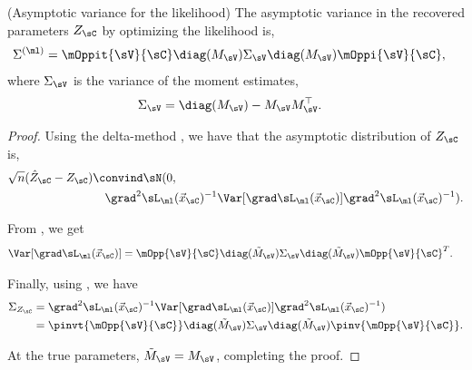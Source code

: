 \begin{lemma}(Asymptotic variance for the likelihood)
  \label{lem:pw-variance}
  The asymptotic variance in the recovered parameters $Z_{\sC}$ by optimizing the likelihood is,
  \begin{align*}
    \Sigma^{(\ml)} &= \mOppit{\sV}{\sC} \diag(M_\sV) \Sigma_\sV \diag(M_\sV) \mOppi{\sV}{\sC},
  \end{align*}
  where $\Sigma_\sV$ is the variance of the moment estimates, 
  \begin{align*}
    \Sigma_\sV &= \diag(M_\sV) - M_\sV M_\sV^\top.
  \end{align*}
\end{lemma}
\begin{proof}
  Using the delta-method \cite{vaart98asymptotic}, we have that the
  asymptotic distribution of $Z_\sC$ is,
  \begin{align*}
    \sqrt{n}(\hat Z_{\sC} - Z_{\sC}) &\convind \sN( 0, \\
      &\quad \grad^2 \sL_\ml(\vec x_\sC)^{-1} \Var[\grad \sL_\ml(\vec x_\sC)] \grad^2 \sL_\ml(\vec x_\sC)^{-1}).
  \end{align*}

  From , we get
  \begin{align*}
    \Var [\grad \sL_\ml(\vec x_\sC)] &= \mOpp{\sV}{\sC} \diag(\tilde M_\sV) \Sigma_\sV \diag(\tilde M_\sV) \mOpp{\sV}{\sC}^T .
  \end{align*}

  Finally, using , we have
  \begin{align*}
    \Sigma_{Z_\sC} 
      &= \grad^2 \sL_\ml(\vec x_\sC)^{-1} \Var [\grad \sL_\ml(\vec x_\sC)] \grad^2 \sL_\ml(\vec x_\sC)^{-1}) \\
      &= \pinvt{\mOpp{\sV}{\sC}} \diag(\tilde M_\sV) \Sigma_\sV \diag(\tilde M_\sV) \pinv{\mOpp{\sV}{\sC}}.
  \end{align*}

  At the true parameters, $\tilde M_\sV = M_\sV$, completing the proof.
\end{proof}

